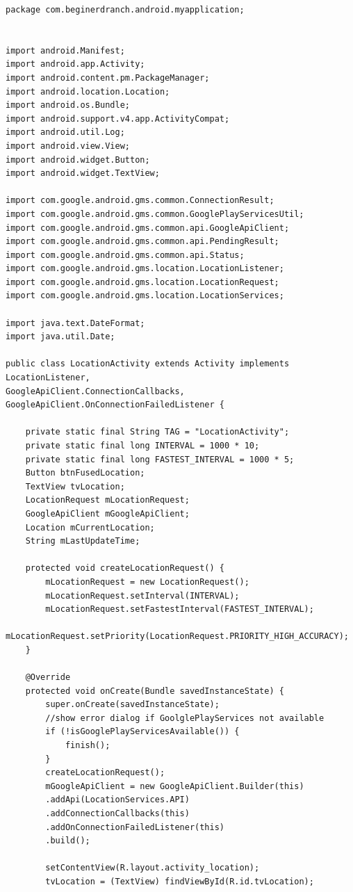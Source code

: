 \documentclass[a4paper,12pt]{article}
\begin{document}
\begin{lstlisting}[caption=Основной код прилжения из LocationActivity.java]
package com.beginerdranch.android.myapplication;


import android.Manifest;
import android.app.Activity;
import android.content.pm.PackageManager;
import android.location.Location;
import android.os.Bundle;
import android.support.v4.app.ActivityCompat;
import android.util.Log;
import android.view.View;
import android.widget.Button;
import android.widget.TextView;

import com.google.android.gms.common.ConnectionResult;
import com.google.android.gms.common.GooglePlayServicesUtil;
import com.google.android.gms.common.api.GoogleApiClient;
import com.google.android.gms.common.api.PendingResult;
import com.google.android.gms.common.api.Status;
import com.google.android.gms.location.LocationListener;
import com.google.android.gms.location.LocationRequest;
import com.google.android.gms.location.LocationServices;

import java.text.DateFormat;
import java.util.Date;

public class LocationActivity extends Activity implements
LocationListener,
GoogleApiClient.ConnectionCallbacks,
GoogleApiClient.OnConnectionFailedListener {

	private static final String TAG = "LocationActivity";
	private static final long INTERVAL = 1000 * 10;
	private static final long FASTEST_INTERVAL = 1000 * 5;
	Button btnFusedLocation;
	TextView tvLocation;
	LocationRequest mLocationRequest;
	GoogleApiClient mGoogleApiClient;
	Location mCurrentLocation;
	String mLastUpdateTime;
	
	protected void createLocationRequest() {
		mLocationRequest = new LocationRequest();
		mLocationRequest.setInterval(INTERVAL);
		mLocationRequest.setFastestInterval(FASTEST_INTERVAL);
		mLocationRequest.setPriority(LocationRequest.PRIORITY_HIGH_ACCURACY);
	}
	
	@Override
	protected void onCreate(Bundle savedInstanceState) {
		super.onCreate(savedInstanceState);
		//show error dialog if GoolglePlayServices not available
		if (!isGooglePlayServicesAvailable()) {
			finish();
		}
		createLocationRequest();
		mGoogleApiClient = new GoogleApiClient.Builder(this)
		.addApi(LocationServices.API)
		.addConnectionCallbacks(this)
		.addOnConnectionFailedListener(this)
		.build();
		
		setContentView(R.layout.activity_location);
		tvLocation = (TextView) findViewById(R.id.tvLocation);
		

\end{lstlisting}
\end{document}
